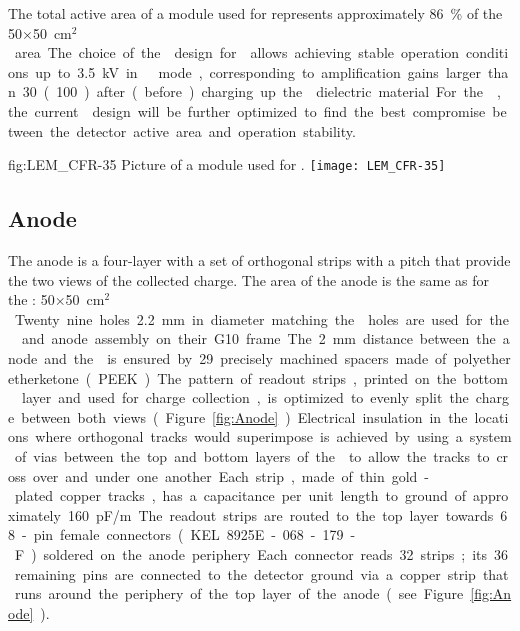 The total active area of a  module used for   represents approximately \SI{86}{\%} of the \num{50}$\times$\SI{50}{cm$^{2}$} area. The choice of the  design for  allows achieving stable operation conditions up to \SI{3.5}{kV} in   mode, corresponding to amplification gains larger than \num{30} (\num{100}) after (before) charging up the  dielectric material. For the , the current  design will be further optimized to find the best compromise between the detector active area and operation stability.

\begin{dunefigure}
{fig:LEM_CFR-35}
{Picture of a  module used for  .}
\texttt{[image: LEM\_CFR-35]}
\end{dunefigure}

\subsection{Anode}
\label{sec:fddp-crp-anode}
 
The anode is a four-layer  with a set of orthogonal strips with a \dpstrippitch pitch that provide the two views of the collected charge. The area of the anode is the same as for the :  \num{50}$\times$\SI{50}{cm$^2$}. Twenty nine holes \SI{2.2}{mm} in diameter matching the  holes are used for the  and anode assembly on their G10 frame. The \SI{2}{mm} distance between the anode and the  is ensured by \num{29} precisely machined spacers made of polyetheretherketone (PEEK). 

The pattern of readout strips, printed on the bottom  layer and used for charge collection, is optimized to evenly split the charge between both views (Figure~\ref{fig:Anode}). Electrical insulation in the locations where orthogonal tracks would superimpose is achieved by 
using a system of vias between the top and bottom layers of the  to allow the tracks to cross over and under one another. 
Each strip, made of thin gold-plated copper tracks, has a capacitance per unit length to ground of approximately 
\SI{160}{pF/m}. The readout strips are routed to the top layer towards \num{68}-pin female connectors (KEL 8925E-068-179-F) soldered on the anode periphery. Each connector reads \num{32} strips; its \num{36} remaining pins are connected to the detector ground via a copper strip that runs around the periphery of the top layer of the anode (see Figure \ref{fig:Anode}). 

